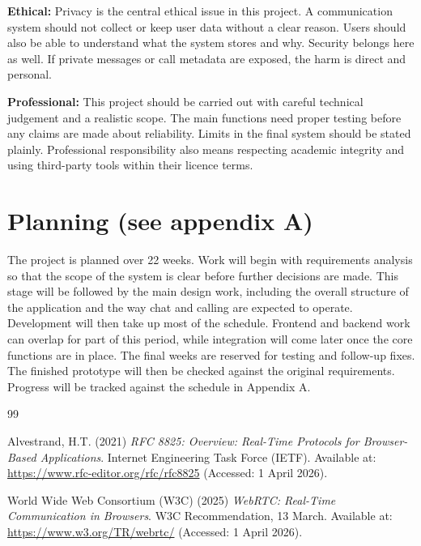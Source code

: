 \documentclass[12pt,a4paper]{article}
\begin{document}
\textbf{Ethical:} Privacy is the central ethical issue in this project. A communication system should not collect or keep user data without a clear reason. Users should also be able to understand what the system stores and why. Security belongs here as well. If private messages or call metadata are exposed, the harm is direct and personal.

\textbf{Professional:} This project should be carried out with careful technical judgement and a realistic scope. The main functions need proper testing before any claims are made about reliability. Limits in the final system should be stated plainly. Professional responsibility also means respecting academic integrity and using third-party tools within their licence terms.

\section{Planning (see appendix A)}

The project is planned over 22 weeks. Work will begin with requirements analysis so that the scope of the system is clear before further decisions are made. This stage will be followed by the main design work, including the overall structure of the application and the way chat and calling are expected to operate. Development will then take up most of the schedule. Frontend and backend work can overlap for part of this period, while integration will come later once the core functions are in place. The final weeks are reserved for testing and follow-up fixes. The finished prototype will then be checked against the original requirements. Progress will be tracked against the schedule in Appendix A.

\renewcommand{\refname}{Initial References}
\begin{thebibliography}{99}

Alvestrand, H.T. (2021) \textit{RFC 8825: Overview: Real-Time Protocols for Browser-Based Applications}. Internet Engineering Task Force (IETF). Available at: \url{https://www.rfc-editor.org/rfc/rfc8825} (Accessed: 1 April 2026).

World Wide Web Consortium (W3C) (2025) \textit{WebRTC: Real-Time Communication in Browsers}. W3C Recommendation, 13 March. Available at: \url{https://www.w3.org/TR/webrtc/} (Accessed: 1 April 2026).

\end{thebibliography}
\end{document}
